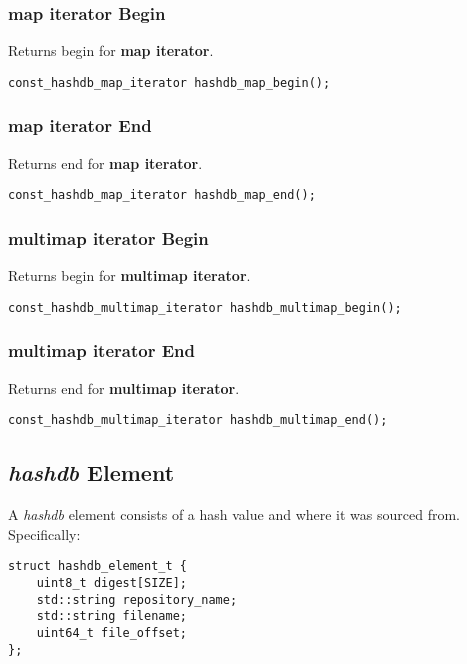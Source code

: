 \documentclass[12pt,twoside]{article}
\newcommand{\hdb}{\emph{hashdb}\xspace}
\newcommand{\mi}{\textbf{map iterator}\xspace}
\newcommand{\mmi}{\textbf{multimap iterator}\xspace}
\begin{document}
\subsubsection{\mi Begin}
Returns begin for \mi.

\begin{small}
\begin{verbatim}
const_hashdb_map_iterator hashdb_map_begin();
\end{verbatim}
\end{small}

\subsubsection{\mi End}
Returns end for \mi.

\begin{small}
\begin{verbatim}
const_hashdb_map_iterator hashdb_map_end();
\end{verbatim}
\end{small}

\subsubsection{\mmi Begin}
Returns begin for \mmi.

\begin{small}
\begin{verbatim}
const_hashdb_multimap_iterator hashdb_multimap_begin();
\end{verbatim}
\end{small}

\subsubsection{\mmi End}
Returns end for \mmi.

\begin{small}
\begin{verbatim}
const_hashdb_multimap_iterator hashdb_multimap_end();
\end{verbatim}
\end{small}

\subsection{\hdb Element}
A \hdb element consists of a hash value and where it was sourced from.
Specifically:
\begin{small}
\begin{verbatim}
struct hashdb_element_t {
    uint8_t digest[SIZE];
    std::string repository_name;
    std::string filename;
    uint64_t file_offset;
};
\end{verbatim}
\end{small}
\end{document}
